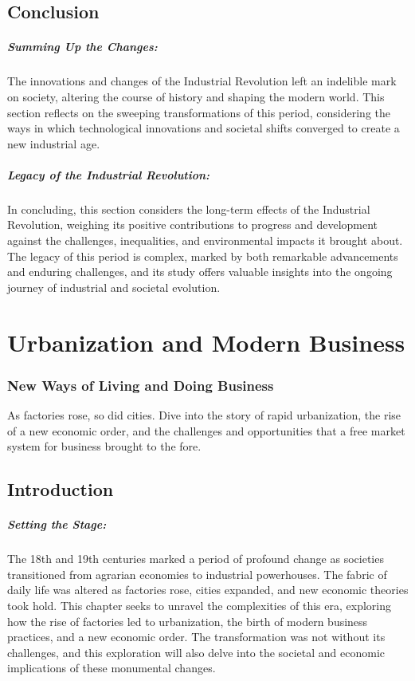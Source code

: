 \documentclass[a4paper,12pt]{book}
\begin{document}
\section*{Conclusion}

\paragraph{Summing Up the Changes:}
The innovations and changes of the Industrial Revolution left an indelible mark on society, altering the course of history and shaping the modern world. This section reflects on the sweeping transformations of this period, considering the ways in which technological innovations and societal shifts converged to create a new industrial age.

\paragraph{Legacy of the Industrial Revolution:}
In concluding, this section considers the long-term effects of the Industrial Revolution, weighing its positive contributions to progress and development against the challenges, inequalities, and environmental impacts it brought about. The legacy of this period is complex, marked by both remarkable advancements and enduring challenges, and its study offers valuable insights into the ongoing journey of industrial and societal evolution.

\chapter{Urbanization and Modern Business}
\subsection*{New Ways of Living and Doing Business}
As factories rose, so did cities. Dive into the story of rapid urbanization, the rise of a new economic order, and the challenges and opportunities that a free market system for business brought to the fore.

\section*{Introduction}

\paragraph{Setting the Stage:}
The 18th and 19th centuries marked a period of profound change as societies transitioned from agrarian economies to industrial powerhouses. The fabric of daily life was altered as factories rose, cities expanded, and new economic theories took hold. This chapter seeks to unravel the complexities of this era, exploring how the rise of factories led to urbanization, the birth of modern business practices, and a new economic order. The transformation was not without its challenges, and this exploration will also delve into the societal and economic implications of these monumental changes.
\end{document}
